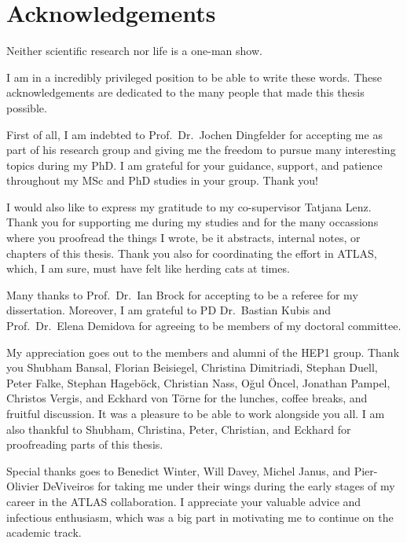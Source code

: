 \chapter*{Acknowledgements}

Neither scientific research nor life is a one-man show.


I am in a incredibly privileged position to be able to write these words. These
acknowledgements are dedicated to the many people that made this thesis
possible.

First of all, I am indebted to Prof.\ Dr.\ Jochen Dingfelder for accepting me as
part of his research group and giving me the freedom to pursue many interesting
topics during my PhD. I am grateful for your guidance, support, and patience
throughout my MSc and PhD studies in your group. Thank you!

I would also like to express my gratitude to my co-supervisor Tatjana
Lenz. Thank you for supporting me during my studies and for the many occassions
where you proofread the things I wrote, be it abstracts, internal notes, or
chapters of this thesis. Thank you also for coordinating the \bbtautau effort in
ATLAS, which, I am sure, must have felt like herding cats at times.

Many thanks to Prof.\ Dr.\ Ian Brock for accepting to be a referee for my
dissertation. Moreover, I am grateful to PD Dr.\ Bastian Kubis and Prof.\ Dr.\
Elena Demidova for agreeing to be members of my doctoral committee.

My appreciation goes out to the members and alumni of the \textsc{HEP1}
group. Thank you Shubham Bansal, Florian Beisiegel, Christina Dimitriadi,
Stephan Duell, Peter Falke, Stephan Hageböck, Christian Nass, Oğul Öncel,
Jonathan Pampel, Christos Vergis, and Eckhard von Törne for the lunches, coffee
breaks, and fruitful discussion. It was a pleasure to be able to work alongside
you all. I am also thankful to Shubham, Christina, Peter, Christian, and Eckhard
for proofreading parts of this thesis.

Special thanks goes to Benedict Winter, Will Davey, Michel Janus, and
Pier-Olivier DeViveiros for taking me under their wings during the early stages
of my career in the ATLAS collaboration. I appreciate your valuable advice and
infectious enthusiasm, which was a big part in motivating me to continue on the
academic track.

